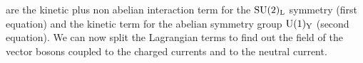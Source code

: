 are the kinetic plus non abelian interaction term for the $\mathrm{SU}(2)_\mathrm{L}$ symmetry
(first equation) and the kinetic term for the abelian symmetry group $\mathrm{U}(1)_\mathrm{Y}$
(second equation). We can now split the Lagrangian terms to find out the field
of the vector bosons coupled to the charged currents and to the neutral current.
